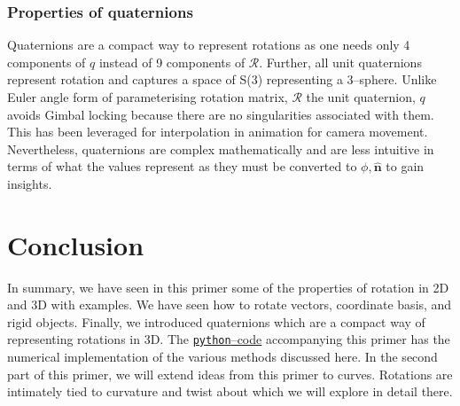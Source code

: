\documentclass{article}
\def\nh{\hat{\mathbf{n}}}
\def\R{\mathcal{R}}
\def\nh{\hat{\mathbf{n}}}
\begin{document}
\subsubsection*{Properties of quaternions}
Quaternions are a compact way to represent rotations as one needs only 4 components of $q$ instead of 9 components of $\R$. Further, all unit quaternions represent rotation and captures a space of S(3) representing a 3--sphere. Unlike Euler angle form of parameterising rotation matrix, $\R$ the unit quaternion, $q$ avoids Gimbal locking because there are no singularities associated with them. This has been leveraged for interpolation in animation for camera movement. Nevertheless, quaternions are complex mathematically and are less intuitive in terms of what the values represent as they must be converted to $\phi, \nh$ to gain insights.

\section{Conclusion}

In summary, we have seen in this primer some of the properties of rotation in 2D and 3D with examples. We have seen how to rotate vectors, coordinate basis, and rigid objects. Finally, we introduced quaternions which are a compact way of representing rotations in 3D. The \href{https://github.com/sgangaprasath/RotationTut/blob/main/Rotations.ipynb}{\texttt{python}--code} accompanying this primer has the numerical implementation of the various methods discussed here. In the second part of this primer, we will extend ideas from this primer to curves. Rotations are intimately tied to curvature and twist about which we will explore in detail there.



\end{document}
